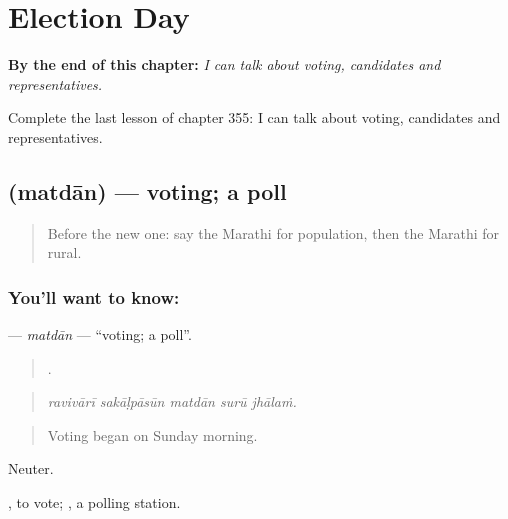 
\chapter{Election Day}
\label{ch:mr-election-day}

\begin{chapteropening}
\textbf{By the end of this chapter:} \emph{I can talk about voting, candidates and representatives.}

Complete the last lesson of chapter 355: I can talk about voting, candidates and representatives.
\end{chapteropening}

\section[\texorpdfstring{\mr{मतदान} (matdān)}{मतदान (matdān)}]{ (matdān) — voting; a poll}

\label{lesson:MR-C355-matdan}



\begin{quote}
Before the new one: say the Marathi for population, then the Marathi for rural.
\end{quote}

\subsection*{You'll want to know: }
\textbf{} — \emph{matdān} — \textquotedblleft{}voting; a poll\textquotedblright{}.

\begin{quote}
    .
\end{quote}

\begin{quote}
\emph{ravivārī sakāḷpāsūn matdān surū jhālaṁ.}
\end{quote}

\begin{quote}
Voting began on Sunday morning.
\end{quote}

Neuter.

 , to vote;  , a polling station.


